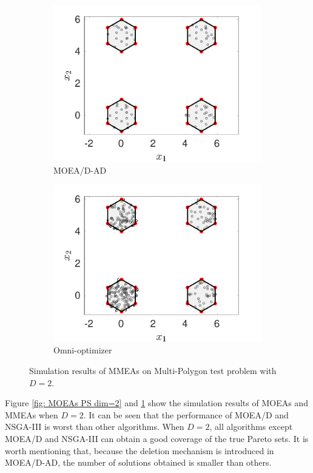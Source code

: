 \documentclass[conference]{IEEEtran}
\begin{document}
\begin{figure}[htbp]
    \begin{subfigure}[b]{.22\textwidth}
    \includegraphics[width=\linewidth]{Section5/dim2/PS/MOEADAD}
    \caption{MOEA/D-AD}
    \end{subfigure}
    \begin{subfigure}[b]{.22\textwidth}
    \includegraphics[width=\linewidth]{Section5/dim2/PS/OmniOptimizer}
    \caption{Omni-optimizer}
    \end{subfigure}
    \caption{Simulation results of MMEAs on Multi-Polygon test problem with $D=2$.}
    \label{fig: MMEAs PS dim=2}
\end{figure}

Figure \ref{fig: MOEAs PS dim=2} and \ref{fig: MMEAs PS dim=2} show the simulation results of MOEAs and MMEAs when $D=2$. It can be seen that the performance of MOEA/D and NSGA-III is worst than other algorithms. When $D=2$, all algorithms except MOEA/D and NSGA-III can obtain a good coverage of the true Pareto sets. It is worth mentioning that, because the deletion mechanism is introduced in MOEA/D-AD, the number of solutions obtained is smaller than others. 
\end{document}

